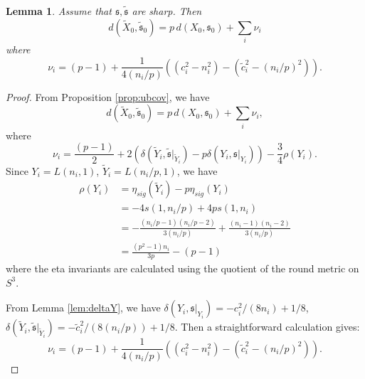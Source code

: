 \documentclass{amsart}
\newtheorem{lemma}[theorem]{Lemma}
\theoremstyle{definition}
\theoremstyle{remark}
\numberwithin{equation}{section}
\begin{document}
\begin{lemma}\label{lem:dimnu}
Assume that $\mathfrak{s}, \widetilde{\mathfrak{s}}$ are sharp. Then
\[
d(\widetilde{X}_0 , \widetilde{\mathfrak{s}}_0) = p \, d(X_0 , \mathfrak{s}_0) + \sum_i \nu_i
\]
where
\begin{equation}\label{equ:nu}
\nu_i = (p-1) + \frac{1}{4(n_i/p)}\left( (c_i^2 - n_i^2) - ( \widetilde{c}_i^2 - (n_i/p)^2 ) \right).
\end{equation}
\end{lemma}
\begin{proof}
From Proposition \ref{prop:ubcov}, we have 
\[
d(\widetilde{X}_0 , \widetilde{\mathfrak{s}}_0) = p \, d(X_0 , \mathfrak{s}_0) + \sum_i \nu_i,
\]
where
\[
\nu_i = \frac{(p-1)}{2} + 2( \delta(\widetilde{Y}_i , \widetilde{\mathfrak{s}}|_{\widetilde{Y}_i}) - p \delta( Y_i , \mathfrak{s}|_{Y_i}) ) - \frac{3}{4}\rho(Y_i).
\]
Since $Y_i = L(n_i,1)$, $\widetilde{Y}_i = L(n_i/p,1)$, we have
\begin{align*}
\rho(Y_i) &= \eta_{sig}(\widetilde{Y}_i) - p \eta_{sig}(Y_i) \\
&= -4 s(1, n_i/p) + 4p s(1,n_i) \\
&= -\frac{(n_i/p-1)(n_i/p-2)}{3(n_i/p)} + \frac{(n_i-1)(n_i-2)}{3(n_i/p)} \\
&= \frac{(p^2-1)n_i}{3p} - (p-1)
\end{align*}
where the eta invariants are calculated using the quotient of the round metric on $S^3$.

From Lemma \ref{lem:deltaY}, we have $\delta( Y_i , \mathfrak{s}|_{Y_i}) = -c_i^2/(8n_i) + 1/8$, $\delta( \widetilde{Y}_i , \widetilde{\mathfrak{s}} |_{\widetilde{Y}_i}) = -\widetilde{c}_i^2/(8(n_i/p)) + 1/8$. Then a straightforward calculation gives:
\[
\nu_i = (p-1) + \frac{1}{4(n_i/p)}\left( (c_i^2 - n_i^2) - ( \widetilde{c}_i^2 - (n_i/p)^2 ) \right).
\]
\end{proof}
\end{document}
